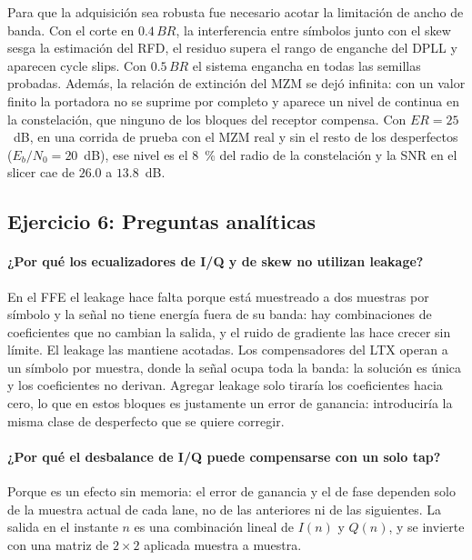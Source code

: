 Para que la adquisición sea robusta fue necesario acotar la limitación de
ancho de banda. Con el corte en $0.4\,BR$, la interferencia entre
símbolos junto con el skew sesga la estimación del RFD, el residuo supera
el rango de enganche del DPLL y aparecen cycle slips. Con $0.5\,BR$ el
sistema engancha en todas las semillas probadas. Además, la relación de
extinción del MZM se dejó infinita: con un valor finito la portadora no
se suprime por completo y aparece un nivel de continua en la
constelación, que ninguno de los bloques del receptor compensa. Con
$ER = 25$~dB, en una corrida de prueba con el MZM real y sin el resto de
los desperfectos ($E_b/N_0 = 20$~dB), ese nivel es el 8~\% del radio de la
constelación y la SNR en el slicer cae de $26.0$ a $13.8$~dB.

\subsection*{Ejercicio 6: Preguntas analíticas}

\paragraph{¿Por qué los ecualizadores de I/Q y de skew no utilizan leakage?}
En el FFE el leakage hace falta porque está muestreado a dos muestras por
símbolo y la señal no tiene energía fuera de su banda: hay combinaciones
de coeficientes que no cambian la salida, y el ruido de gradiente las
hace crecer sin límite. El leakage las mantiene acotadas. Los
compensadores del LTX operan a un símbolo por muestra, donde la señal
ocupa toda la banda: la solución es única y los coeficientes no derivan.
Agregar leakage solo tiraría los coeficientes hacia cero, lo que en estos
bloques es justamente un error de ganancia: introduciría la misma clase
de desperfecto que se quiere corregir.

\paragraph{¿Por qué el desbalance de I/Q puede compensarse con un solo tap?}
Porque es un efecto sin memoria: el error de ganancia y el de fase
dependen solo de la muestra actual de cada lane, no de las anteriores ni
de las siguientes. La salida en el instante $n$ es una combinación lineal
de $I(n)$ y $Q(n)$, y se invierte con una matriz de $2\times2$ aplicada
muestra a muestra.

